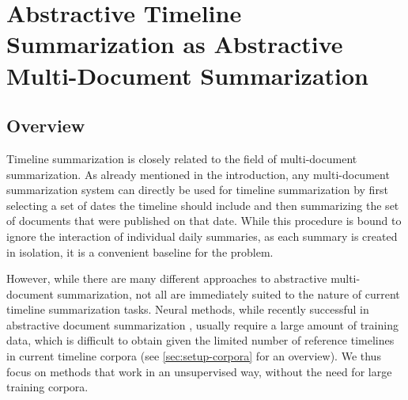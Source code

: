 \documentclass[a4paper,BCOR=10mm]{report}
\numberwithin{lemma}{chapter}
\numberwithin{definition}{chapter}
\begin{document}









\chapter{Abstractive Timeline Summarization as Abstractive Multi-Document Summarization} \label{sec:baseline}

\section{Overview}

Timeline summarization is closely related to the field of multi-document summarization. As already mentioned in the introduction, any multi-document summarization system can directly be used for timeline summarization by first selecting a set of dates the timeline should include and then summarizing the set of documents that were published on that date.
While this procedure is bound to ignore the interaction of individual daily summaries, as each summary is created in isolation, it is a convenient baseline for the problem.

However, while there are many different approaches to abstractive multi-document summarization, not all are immediately suited to the nature of current timeline summarization tasks. Neural methods, while recently successful in abstractive document summarization \citep{paulus}, usually require a large amount of training data, which is difficult to obtain given the limited number of reference timelines in current timeline corpora (see \ref{sec:setup-corpora} for an overview).
We thus focus on methods that work in an unsupervised way, without the need for large training corpora.
\end{document}
